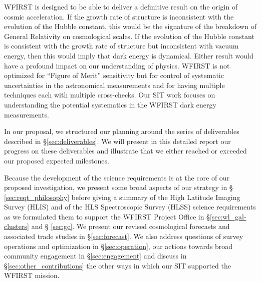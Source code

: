 \begin{summary}
WFIRST is designed to be able to deliver a definitive result on the origin of
cosmic acceleration.  If the growth rate of structure is inconsistent with the
evolution of the Hubble constant, this would be the signature of  the breakdown
of General Relativity on cosmological scales.  If the evolution of the Hubble
constant is consistent with the growth rate of structure but inconsistent with
vacuum energy, then this would imply that dark energy is dynamical.  Either
result would have a profound impact on our understanding of physics.  WFIRST is
not optimized for “Figure of Merit” sensitivity but for control of systematic
uncertainties in the astronomical measurements and for having multiple
techniques each with multiple cross-checks.  Our SIT work focuses on
understanding the potential systematics in the WFIRST dark energy measurements.


In our proposal, we structured our planning around the series of deliverables
described in \S \ref{sec:deliverables}. We will present in this detailed report our progress on
these deliverables and illustrate that we either reached or exceeded our proposed
expected milestones.

Because the development of the science requirements is at the core of our proposed
investigation, we present some broad aspects of our strategy in \S
\ref{sec:reqt_philosophy} before giving a summary of the High Latitude Imaging
Survey (HLIS) and of the HLS Spectroscopic Survey (HLSS) science requirements as we formulated them to support the WFIRST Project Office in \S \ref{sec:wl_gal-clusters} and \S
\ref{sec:gc}. We present our revised cosmological forecasts and associated trade studies in
\S \ref{sec:forecast}. We also address questions of survey operations and
optimization in \S \ref{sec:operation}, our actions towards broad community engagement
in \S \ref{sec:engagement} and discuss in \S \ref{sec:other_contributions} the
other ways in which our SIT supported the WFIRST mission.
\end{summary}



